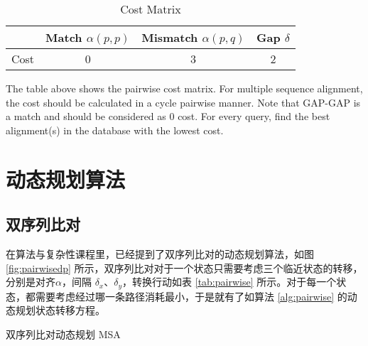     \begin{table}[H]
        \centering
        \caption{Cost Matrix}\label{tab:costmat}
        \begin{tabular}{cccc}
            \toprule
                & Match $\alpha(p,p)$ & Mismatch $\alpha(p,q)$ & Gap $\delta$ \\
            \midrule
            Cost & 0 & 3 & 2 \\
            \bottomrule
        \end{tabular}
    \end{table}

    The table above shows the pairwise cost matrix. For multiple sequence alignment, the cost should be calculated in a cycle pairwise manner. Note that GAP-GAP is a match and should be considered as 0 cost. For every query, find the best alignment(s) in the database with the lowest cost.

    \section{动态规划算法}

    \subsection{双序列比对}

    在算法与复杂性课程\cite{algcom}里，已经提到了双序列比对的动态规划算法，如图 \ref{fig:pairwisedp} 所示，双序列比对对于一个状态只需要考虑三个临近状态的转移，分别是对齐$\alpha$，间隔 $\delta_x$、$\delta_y$，转换行动如表 \ref{tab:pairwise} 所示。对于每一个状态，都需要考虑经过哪一条路径消耗最小，于是就有了如算法 \ref{alg:pairwise} 的动态规划状态转移方程。

    \begin{algorithm}[H]
        \caption{双序列比对动态规划 MSA}\label{alg:pairwise}
        \BlankLine
        \;
    \end{algorithm}


